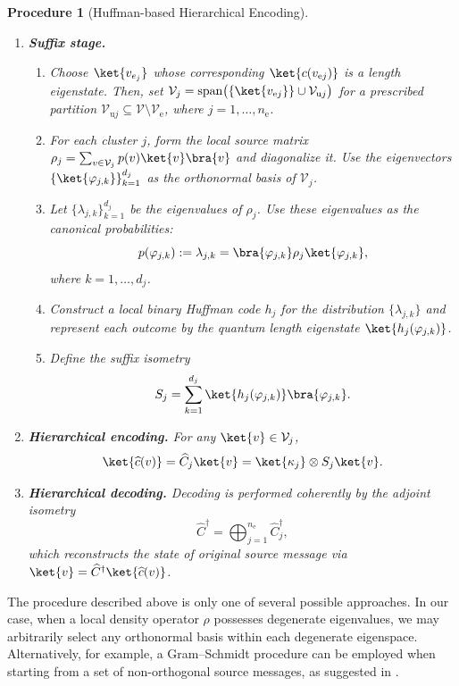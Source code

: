 \documentclass[conference]{IEEEtran}
\newtheorem{procedure}{Procedure}
\begin{document}
\begin{procedure}[Huffman-based Hierarchical Encoding]
\begin{enumerate}[label=\textbf{\arabic*)}]
\item \textbf{Suffix stage.}
\begin{enumerate}[label=(\alph*)]
\item Choose $\ket{v_{e_j}}$ whose corresponding $\ket{c(v_{\mathrm{e}j})}$ is a length eigenstate. Then, set
$\mathcal{V}_j=\mathrm{span}\bigl(\{\ket{v_{\mathrm{e}j}}\}\cup\mathcal{V}_{\mathrm{u}j}\bigr)$ for a prescribed partition $\mathcal{V}_{\mathrm{u}j}\subseteq\mathcal{V}\setminus\mathcal{V}_{\mathrm{e}}$, where
$j=1,\dots,n_{\mathrm{e}}$.
\item For each cluster $j$, form the local source matrix
\(\rho_j=\sum_{v\in\mathcal{V}_j} p(v)\ket{v}\bra{v}\) and diagonalize it. Use the eigenvectors
\(\{\ket{\varphi_{j,k}}\}_{k=1}^{d_j}\) as the orthonormal basis of \(\mathcal{V}_j\).
\item Let \(\{\lambda_{j,k}\}_{k=1}^{d_j}\) be the eigenvalues of \(\rho_j\). Use these eigenvalues as the canonical probabilities:
\[
p(\varphi_{j,k}):=\lambda_{j,k}=\bra{\varphi_{j,k}}\rho_j\ket{\varphi_{j,k}},
\]
where $k=1,\dots,d_j$.
\item Construct a local binary Huffman code \(h_j\) for the distribution \(\{\lambda_{j,k}\}\)
and represent each outcome by the quantum length eigenstate \(\ket{h_j(\varphi_{j,k})}\).
\item Define the suffix isometry
\[
S_j=\sum_{k=1}^{d_j}\ket{h_j(\varphi_{j,k})}\bra{\varphi_{j,k}}.
\]
\end{enumerate}
\item \textbf{Hierarchical encoding.}
For any $\ket{v}\in\mathcal{V}_j$,
\[
\ket{\widehat{c}(v)}
=\widehat{C}_j\ket{v}
=\ket{\kappa_j}\otimes S_j\ket{v}.
\]
\item \textbf{Hierarchical decoding.}
Decoding is performed coherently by the adjoint isometry
\[
\widehat{C}^\dagger
=\bigoplus_{j=1}^{n_{\mathrm{e}}}\widehat{C}_j^\dagger,
\]
which reconstructs the state of original source message via 
$\ket{v}=\widehat{C}^\dagger\ket{\widehat{c}(v)}$.
\end{enumerate}
\end{procedure}

The procedure described above is only one of several possible approaches. In our case, when a local density operator \(\rho\) possesses degenerate eigenvalues, we may arbitrarily select any orthonormal basis within each degenerate eigenspace. Alternatively, for example, a Gram–Schmidt procedure can be employed when starting from a set of non-orthogonal source messages, as suggested in \cite{PhysRevA.65.032313}. 
\end{document}
